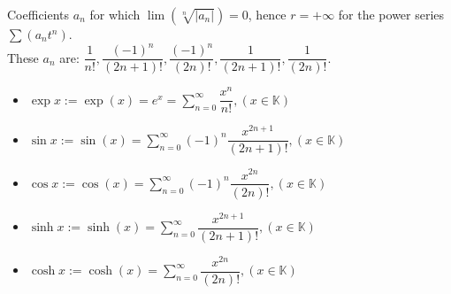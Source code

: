 \documentclass[margin=0px]{article}
\begin{document}
Coefficients $a_{n}$ for which $\lim{(\sqrt[n]{|a_{n}|})} = 0$, hence $r = +\infty$ for the power series $\sum{(a_{n}t^{n})}$. \vspace{0.3cm} \\
These $a_{n}$ are: $\dfrac{1}{n!}, \dfrac{(-1)^n}{(2n+1)!}, \dfrac{(-1)^n}{(2n)!}, \dfrac{1}{(2n+1)!}, \dfrac{1}{(2n)!}$.
\begin{itemize}
    \item $\exp{x} := \exp{(x)} = e^{x} = \sum\limits_{n=0}^{\infty}{\dfrac{x^n}{n!}, (x \in \mathbb{K})}$
    \item $\sin{x} := \sin{(x)} = \sum\limits_{n=0}^{\infty}{(-1)^n\dfrac{x^{2n+1}}{(2n+1)!}, (x \in \mathbb{K})}$
    \item $\cos{x} := \cos{(x)} = \sum\limits_{n=0}^{\infty}{(-1)^n\dfrac{x^{2n}}{(2n)!}, (x \in \mathbb{K})}$
    \item $\sinh{x} := \sinh{(x)} = \sum\limits_{n=0}^{\infty}{\dfrac{x^{2n+1}}{(2n+1)!}, (x \in \mathbb{K})}$
    \item $\cosh{x} := \cosh{(x)} = \sum\limits_{n=0}^{\infty}{\dfrac{x^{2n}}{(2n)!}, (x \in \mathbb{K})}$
\end{itemize}
\end{document}
